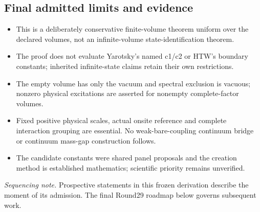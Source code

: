 \subsection*{Final admitted limits and evidence}
\begin{itemize}
\item This is a deliberately conservative finite-volume theorem uniform over the declared volumes, not an infinite-volume state-identification theorem.
\item The proof does not evaluate Yarotsky's named c1/c2 or HTW's boundary constants; inherited infinite-state claims retain their own restrictions.
\item The empty volume has only the vacuum and spectral exclusion is vacuous; nonzero physical excitations are asserted for nonempty complete-factor volumes.
\item Fixed positive physical scales, actual onsite reference and complete interaction grouping are essential. No weak-bare-coupling continuum bridge or continuum mass-gap construction follows.
\item The candidate constants were shared panel proposals and the creation method is established mathematics; scientific priority remains unverified.
\end{itemize}
\par{}\par{}

\emph{Sequencing note.} Prospective statements in this frozen derivation describe the moment of its admission. The final Round29 roadmap below governs subsequent work.
